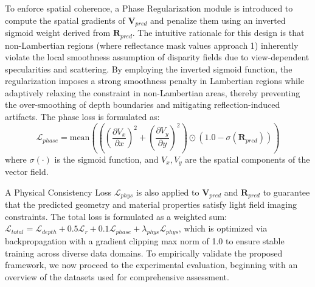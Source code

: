 To enforce spatial coherence, a Phase Regularization module is introduced to compute the spatial gradients of $\mathbf{V}_{pred}$ and penalize them using an inverted sigmoid weight derived from $\mathbf{R}_{pred}$. The intuitive rationale for this design is that non-Lambertian regions (where reflectance mask values approach 1) inherently violate the local smoothness assumption of disparity fields due to view-dependent specularities and scattering. By employing the inverted sigmoid function, the regularization imposes a strong smoothness penalty in Lambertian regions while adaptively relaxing the constraint in non-Lambertian areas, thereby preventing the over-smoothing of depth boundaries and mitigating reflection-induced artifacts. The phase loss is formulated as:
\begin{equation}
\label{eq:eq3}
\mathcal{L}_{phase} = \text{mean}\left( \left( \left(\frac{\partial V_x}{\partial x}\right)^2 + \left(\frac{\partial V_y}{\partial y}\right)^2 \right) \odot (1.0 - \sigma(\mathbf{R}_{pred})) \right)
\end{equation}
where $\sigma(\cdot)$ is the sigmoid function, and $V_x, V_y$ are the spatial components of the vector field. 

A Physical Consistency Loss $\mathcal{L}_{phys}$ is also applied to $\mathbf{V}_{pred}$ and $\mathbf{R}_{pred}$ to guarantee that the predicted geometry and material properties satisfy light field imaging constraints. The total loss is formulated as a weighted sum: $\mathcal{L}_{total} = \mathcal{L}_{depth} + 0.5\mathcal{L}_{r} + 0.1\mathcal{L}_{phase} + \lambda_{phys}\mathcal{L}_{phys}$, which is optimized via backpropagation with a gradient clipping max norm of 1.0 to ensure stable training across diverse data domains. To empirically validate the proposed framework, we now proceed to the experimental evaluation, beginning with an overview of the datasets used for comprehensive assessment.